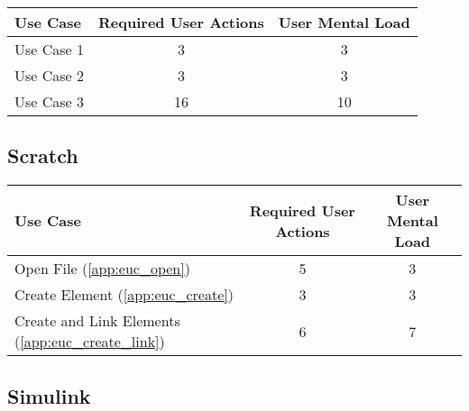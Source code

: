\begin{tabularx}{\textwidth}{Xcc}
\textbf{Use Case} & \textbf{Required User Actions} & \textbf{User Mental Load}\\
\hline
Use Case 1                          & 3 & 3 \\
Use Case 2                          & 3 & 3 \\
Use Case 3                          & 16 & 10
\end{tabularx}

\subsection*{Scratch}




\begin{tabularx}{\textwidth}{Xcc}
\textbf{Use Case} & \textbf{Required User Actions} & \textbf{User Mental Load}\\
\hline
Open File (\ref{app:euc_open})                       & 5 & 3 \\
Create Element (\ref{app:euc_create})                & 3 & 3 \\
Create and Link Elements (\ref{app:euc_create_link}) & 6 & 7
\end{tabularx}

\subsection*{Simulink}

